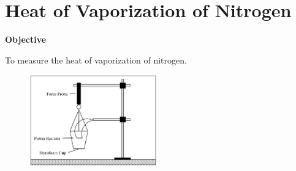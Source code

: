 \section{Heat of Vaporization of Nitrogen}

\makelabheader %

\bigskip

\textbf{Objective}

To measure the heat of vaporization of nitrogen.

\begin{figure}
    \vspace{0.1in}
    \includegraphics[width=0.49\textwidth]{latent_heat_of_vaporization_of_nitrogen/heat_vap_nit_fig_1.eps}
\end{figure}

\bigskip

